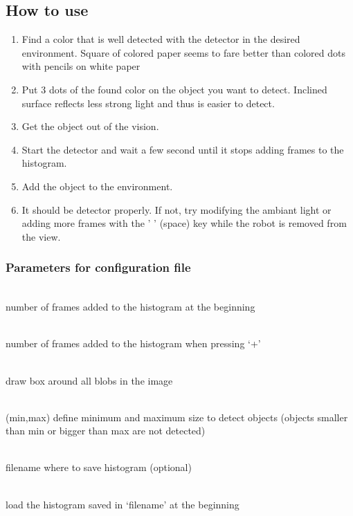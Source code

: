 \subsection{How to use}
\label{sec:ohd:howto}
    \begin{enumerate}
        \item Find a color that is well detected with the detector 
            in the desired environment. Square of colored paper 
            seems to fare better than 
            colored dots with pencils on white paper 
        \item Put 3 dots of the found color on the object you want to 
            detect. Inclined surface reflects less strong light 
            and thus is easier to detect.
        \item Get the object out of the vision.
        \item Start the detector and wait a few second until it stops 
            adding frames to the histogram.
        \item Add the object to the environment. 
        \item It should be detector properly. If not, try modifying the 
            ambiant light or adding more frames with the ' ' (space) 
            key while the robot is removed from the view.
    \end{enumerate}

\subsubsection{Parameters for configuration file}
\label{sec:ohd:howto:params}
    \begin{description} \itemindent=-15pt
        \item[examples\_init] \hfill \\ number of frames added to the histogram at the beginning
        \item[examples\_renew] \hfill \\ number of frames added to the histogram when pressing ‘+’
        \item[box] \hfill \\ draw box around all blobs in the image
        \item[area] \hfill \\ (min,max) define minimum and maximum size to detect objects (objects smaller than min or bigger than max are not detected)
        \item[filename] \hfill \\ filename where to save histogram (optional)
        \item[autoload] \hfill \\ load the histogram saved in ‘filename’ at the beginning
    \end{description}

